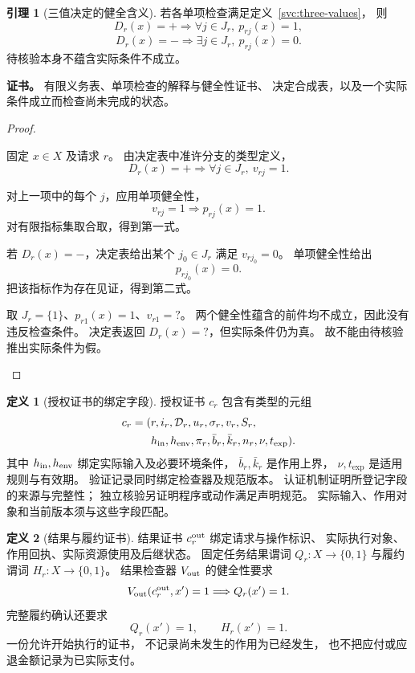 \documentclass[UTF8,12pt,a4paper,openany,fontset=none,zihao=false]{ctexrep}
\theoremstyle{definition}
\newtheorem{definition}{定义}[chapter]
\newtheorem{lemma}{引理}[chapter]
\newenvironment{certificate}{\par\noindent\textbf{证书。}\ignorespaces}{\par}
\newcommand{\1}{\mathbf 1}
\begin{document}
\begin{lemma}[三值决定的健全含义]
\label{svc:three-sound}
若各单项检查满足定义~\ref{svc:three-values}，
则
\[
D_r(x)=+
\Longrightarrow
\forall j\in J_r,\ p_{rj}(x)=1,
\]
\[
D_r(x)=-
\Longrightarrow
\exists j\in J_r,\ p_{rj}(x)=0.
\]
待核验本身不蕴含实际条件不成立。
\end{lemma}
\begin{certificate}
有限义务表、单项检查的解释与健全性证书、
决定合成表，以及一个实际条件成立而检查尚未完成的状态。
\end{certificate}
\begin{proof}
\begin{semanticsteps}
\item 固定 \(x\in X\) 及请求 \(r\)。
由决定表中准许分支的类型定义，
\[
D_r(x)=+\Longrightarrow
\forall j\in J_r,\ v_{rj}=1.
\]
\item 对上一项中的每个 \(j\)，应用单项健全性，
\[
v_{rj}=1\Longrightarrow p_{rj}(x)=1.
\]
对有限指标集取合取，得到第一式。
\item 若 \(D_r(x)=-\)，决定表给出某个
\(j_0\in J_r\) 满足 \(v_{rj_0}=0\)。
单项健全性给出
\[
p_{rj_0}(x)=0.
\]
把该指标作为存在见证，得到第二式。
\item 取 \(J_r=\{1\}\)、\(p_{r1}(x)=1\)、\(v_{r1}=?\)。
两个健全性蕴含的前件均不成立，因此没有违反检查条件。
决定表返回 \(D_r(x)=?\)，但实际条件仍为真。
故不能由待核验推出实际条件为假。
\end{semanticsteps}
\end{proof}

\begin{definition}[授权证书的绑定字段]
\label{svc:authorization-certificate}
授权证书 \(c_r\) 包含有类型的元组
\[
\begin{aligned}
c_r=(&r,i_r,\mathcal D_r,u_r,\sigma_r,v_r,S_r,\\
&h_{\rm in},h_{\rm env},\pi_r,
\bar b_r,\bar k_r,n_r,\nu,t_{\exp}).
\end{aligned}
\]
其中 \(h_{\rm in},h_{\rm env}\) 绑定实际输入及必要环境条件，
\(\bar b_r,\bar k_r\) 是作用上界，
\(\nu,t_{\exp}\) 是适用规则与有效期。
验证记录同时绑定检查器及规范版本。
认证机制证明所登记字段的来源与完整性；
独立核验另证明程序或动作满足声明规范。
实际输入、作用对象和当前版本须与这些字段匹配。
\end{definition}

\begin{definition}[结果与履约证书]
\label{svc:result-certificate}
结果证书 \(c_r^{\rm out}\) 绑定请求与操作标识、
实际执行对象、作用回执、实际资源使用及后继状态。
固定任务结果谓词 \(Q_r:X\to\{0,1\}\) 与履约谓词
\(H_r:X\to\{0,1\}\)。
结果检查器 \(V_{\rm out}\) 的健全性要求
\[
V_{\rm out}(c_r^{\rm out},x')=1
\Longrightarrow Q_r(x')=1.
\]
完整履约确认还要求
\[
Q_r(x')=1,\qquad H_r(x')=1.
\]
一份允许开始执行的证书，
不记录尚未发生的作用为已经发生，
也不把应付或应退金额记录为已实际支付。
\end{definition}
\end{document}
